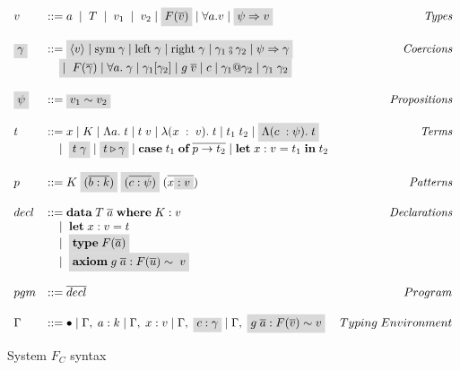 \begin{figure}
\small
\[
\begin{array}{l l r}
    v &::= a \;  \; | \;  \; T \;  \; | \;  \; v_1 \;  \; | \;  \; v_2  \; | \;
    \highlight{F(\overline{v})}  \; | \;  \forall a. v  \; | \; \highlight{\psi
    \Rightarrow v} &\textit{Types}\\ \\
    \highlight{\gamma} &::= \highlight{\langle v \rangle \; | \; \text{sym} \; \gamma \; | \;
    \text{left} \; \gamma \; | \; \text{right} \; \gamma \; | \; \gamma_1
    \fctrans
    \gamma_2 \; | \; \psi \Rightarrow \gamma} &\textit{Coercions} \\ 
    \; &\quad \highlight{| \; \; F(\overline{\gamma}) \; | \; \forall a . \; \gamma \; | \;
    \gamma_1 [\gamma_2] \; | \; g \; \overline{v} \; | \; c \; | \; \gamma_1 @
    \gamma_2 \; | \; \gamma_1 \; \gamma_2} \\ \\
    \highlight{\psi} &::= \highlight{v_1 \sim v_2} &\textit{Propositions}\\ \\
    t &::= x \; | \; K \; | \; \Lambda a . \; t \; | \; t \; v \; | \;
    \lambda(x\; : \; v). \; t \; | \; t_1 \; t_2 \; | \; \highlight{\Lambda(c \; : \psi).
    \; t} &\textit{Terms} \\
          &\quad | \; \; \highlight{t \; \gamma} \; | \; \highlight{t \triangleright \gamma} \; | \;
    \textbf{case} \; t_1 \; \textbf{of} \; \overline{p \rightarrow t_2} \; | \;
    \textbf{let} \; x : v = t_1 \; \textbf{in} \; t_2 \\ \\
    p &::= K \; \highlight{(\overline{b : k})} \; \highlight{(\overline{c : \psi})} \;
    (\overline{x \highlight{: v}}) &\textit{Patterns}\\ \\
    decl &::= \textbf{data} \; T \; \overline{a} \; \textbf{where} \; K : v
         &\textit{Declarations}\\
         &\quad | \; \; \textbf{let} \; x : v = t \\
         &\quad | \; \; \highlight{\textbf{type} \; F(\overline{a})} \\
         &\quad | \; \; \highlight{\textbf{axiom} \; g \; \overline{a} :
         F(\overline{u}) \sim \; v} \\ \\
    pgm &::= \overline{decl} &Program \\ \\
    \Gamma &::= \bullet \mid \Gamma, \; a : k \mid \Gamma, \; x : v \mid \Gamma,
    \; \highlight{c : \gamma} \mid \Gamma, \; \highlight{g \; \overline{a} :
    F(\overline{v}) \sim v} &Typing \; Environment
\end{array}
\]
\caption{System $F_C$ syntax}
\label{fc-syntax}
\end{figure}

